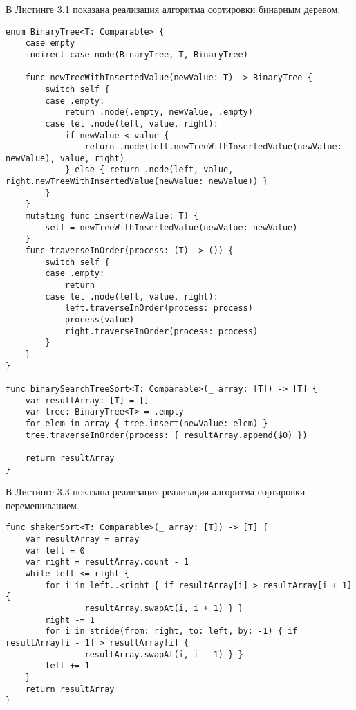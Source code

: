 \hspace{0.6cm}В Листинге 3.1 показана реализация алгоритма сортировки бинарным деревом.
\begin{lstlisting}[caption=Функция алгоритма сортировки бинарным деревом]
enum BinaryTree<T: Comparable> {
    case empty
    indirect case node(BinaryTree, T, BinaryTree)
    
    func newTreeWithInsertedValue(newValue: T) -> BinaryTree {
        switch self {
        case .empty:
            return .node(.empty, newValue, .empty)
        case let .node(left, value, right):
            if newValue < value {
                return .node(left.newTreeWithInsertedValue(newValue: newValue), value, right)
            } else { return .node(left, value, right.newTreeWithInsertedValue(newValue: newValue)) }
        }
    }
    mutating func insert(newValue: T) {
        self = newTreeWithInsertedValue(newValue: newValue)
    }
    func traverseInOrder(process: (T) -> ()) {
        switch self {
        case .empty:
            return
        case let .node(left, value, right):
            left.traverseInOrder(process: process)
            process(value)
            right.traverseInOrder(process: process)
        }
    }
}

func binarySearchTreeSort<T: Comparable>(_ array: [T]) -> [T] {
    var resultArray: [T] = []
    var tree: BinaryTree<T> = .empty
    for elem in array { tree.insert(newValue: elem) }
    tree.traverseInOrder(process: { resultArray.append($0) })
    
    return resultArray
}
\end{lstlisting}

\hspace{0.6cm}В Листинге 3.3 показана реализация реализация алгоритма сортировки перемешиванием.
\begin{lstlisting}[caption=Функция алгоритма сортировки перемешиванием]
func shakerSort<T: Comparable>(_ array: [T]) -> [T] {
    var resultArray = array
    var left = 0
    var right = resultArray.count - 1
    while left <= right {
        for i in left..<right { if resultArray[i] > resultArray[i + 1] { 
        		resultArray.swapAt(i, i + 1) } }
        right -= 1
        for i in stride(from: right, to: left, by: -1) { if resultArray[i - 1] > resultArray[i] { 
        		resultArray.swapAt(i, i - 1) } }
        left += 1
    }
    return resultArray
}
\end{lstlisting}

